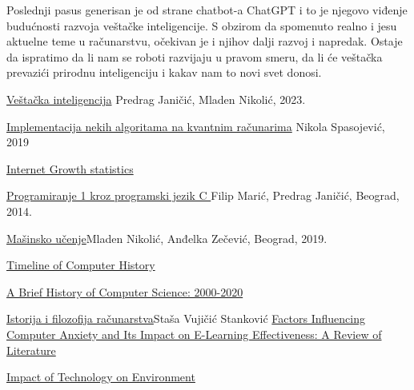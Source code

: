 \documentclass[a4paper]{article}
\begin{document}
{Poslednji pasus generisan je od strane chatbot-a ChatGPT i to je njegovo viđenje budućnosti razvoja veštačke inteligencije. S obzirom da spomenuto realno i jesu aktuelne teme u računarstvu, očekivan je i njihov dalji razvoj i napredak. Ostaje da ispratimo da li nam se roboti razvijaju u pravom smeru, da li će veštačka prevazići prirodnu inteligenciju i kakav nam to novi svet donosi.


\appendix  
% 


\begin{thebibliography}{Literatura}
        \href{http://poincare.matf.bg.ac.rs/~janicic//books/VI_B5.pdf}{Veštačka inteligencija}{ Predrag Janičić, Mladen Nikolić, 2023.}

        \href{http://www.racunarstvo.matf.bg.ac.rs/MasterRadovi/2017_06_05_Nikola_Spasojevic/rad.pdf}{Implementacija nekih algoritama na kvantnim računarima} {Nikola Spasojević, 2019}

        \href{https://www.internetworldstats.com/emarketing.htm}{Internet Growth statistics}

        \href{http://poincare.matf.bg.ac.rs/~sana/Programiranje1_M/p1_I_smer.pdf}{Programiranje 1 kroz programski jezik C }{
Filip Marić, Predrag Janičić, Beograd, 2014.}

        \href{https://ml.matf.bg.ac.rs/readings/ml.pdf}{Mašinsko učenje}{Mladen Nikolić, Anđelka Zečević, Beograd, 2019.}

        \href{https://www.computerhistory.org/timeline/}{Timeline of Computer History}

        \href{https://academicinfluence.com/inflection/study-guides/computer-science-2000-2020}{A Brief History of Computer Science: 2000-2020}
        
        \href{https://stasa.in.rs/wp-content/uploads/IFR-04.pdf}{Istorija i filozofija
računarstva}{Staša Vujičić Stanković}
        \href{https://files.eric.ed.gov/fulltext/ED501623.pdf}{Factors Influencing Computer Anxiety and Its Impact on E-Learning Effectiveness: A
Review of Literature }

        \href{http://ijesi.org/papers/Conf.1802(ICMEEP)/Vol-5/12.%2053-55.pdf}{Impact of Technology on Environment}


\end{thebibliography}}
\end{document}
